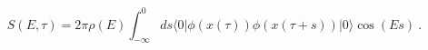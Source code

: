 \begin{equation} \label{l81-04}
S(E, \tau)=2\pi \rho (E) \int _{-\infty}^{0}ds\langle 0|\phi(x(\tau))\phi(x(\tau +s))|0\rangle\cos(Es)~.
\end{equation}

